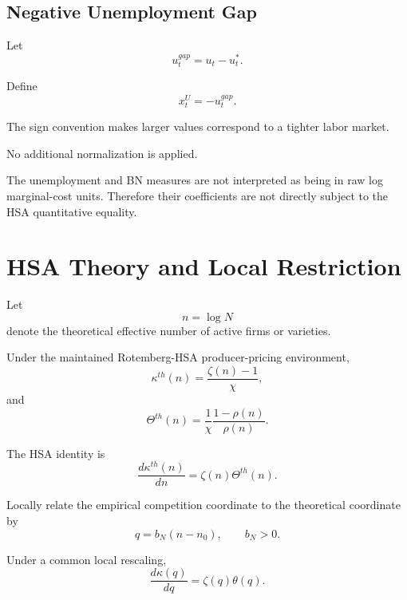 \documentclass[11pt]{article}
\begin{document}
\subsection{Negative Unemployment Gap}

Let
\begin{equation}
u_t^{gap}=u_t-u_t^\ast.
\end{equation}

Define
\begin{equation}
x_t^{U}
=
-u_t^{gap}.
\end{equation}

The sign convention makes larger values correspond to a tighter labor market.

No additional normalization is applied.

The unemployment and BN measures are not interpreted as being in raw log marginal-cost units. Therefore their coefficients are not directly subject to the HSA quantitative equality.

\section{HSA Theory and Local Restriction}

Let
\begin{equation}
n=\log N
\end{equation}
denote the theoretical effective number of active firms or varieties.

Under the maintained Rotemberg-HSA producer-pricing environment,
\begin{equation}
\kappa^{th}(n)
=
\frac{\zeta(n)-1}{\chi},
\end{equation}
and
\begin{equation}
\Theta^{th}(n)
=
\frac{1}{\chi}
\frac{1-\rho(n)}{\rho(n)}.
\end{equation}

The HSA identity is
\begin{equation}
\frac{d\kappa^{th}(n)}{dn}
=
\zeta(n)\Theta^{th}(n).
\label{eq:hsa_identity}
\end{equation}

Locally relate the empirical competition coordinate to the theoretical coordinate by
\begin{equation}
q=b_N(n-n_0),
\qquad b_N>0.
\end{equation}

Under a common local rescaling,
\begin{equation}
\frac{d\kappa(q)}{dq}
=
\zeta(q)\theta(q).
\end{equation}
\end{document}
